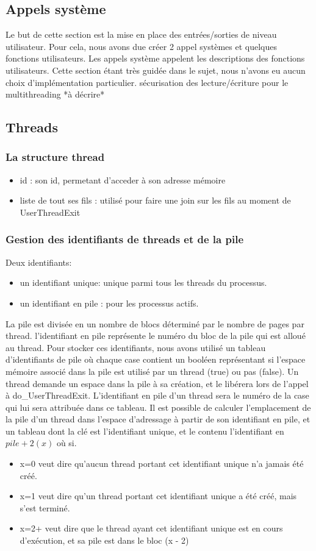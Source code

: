 \documentclass{article}
\begin{document}
	\subsection{Appels système}
	    {Le but de cette section est la mise en place des entrées/sorties de niveau utilisateur. Pour cela, nous avons due créer 2 appel systèmes et quelques fonctions utilisateurs. Les appels système appelent les descriptions des fonctions utilisateurs. Cette section étant très guidée dans le sujet, nous n'avons eu aucun choix d'implémentation particulier.
	    sécurisation des lecture/écriture pour le multithreading
		*à décrire*}
	\subsection{Threads}
		\subsubsection{La structure thread}
			\begin{itemize}
				\item id : son id, permetant d'acceder à son adresse mémoire
				\item liste de tout ses fils : utilisé pour faire une join sur les fils au moment de UserThreadExit
			\end{itemize}
		\subsubsection{Gestion des identifiants de threads et de la pile}
			{Deux identifiants:}
			\begin{itemize}
				\item{un identifiant unique: unique parmi tous les threads du processus.}
				\item{un identifiant en pile : pour les processus actifs.}
			\end{itemize}
			{La pile est divisée en un nombre de blocs déterminé par le nombre de pages par thread. l'identifiant en pile représente le numéro du bloc de la pile qui est alloué au thread. Pour stocker ces identifiants, nous avons utilisé un tableau d'identifiants de pile où chaque case contient un booléen représentant si l'espace mémoire associé dans la pile est utilisé par un thread (true) ou pas (false). }
			{Un thread demande un espace dans la pile à sa création, et le libérera lors de l'appel à do_UserThreadExit. L'identifiant en pile d'un thread sera le numéro de la case qui lui sera attribuée dans ce tableau. Il est possible de calculer l'emplacement de la pile d'un thread dans l'espace d'adressage à partir de son identifiant en pile, et un tableau dont la clé est l'identifiant unique, et le contenu l'identifiant en $pile + 2 (x)$ où si.}
				\begin{itemize}
					\item{x=0 veut dire qu'aucun thread portant cet identifiant unique n'a jamais été créé.}
					\item{x=1 veut dire qu'un thread portant cet identifiant unique a été créé, mais s'est terminé.}
					\item{x=2+ veut dire que le thread ayant cet identifiant unique est en cours d'exécution, et sa pile est dans le bloc (x - 2)}
				\end{itemize}
\end{document}
